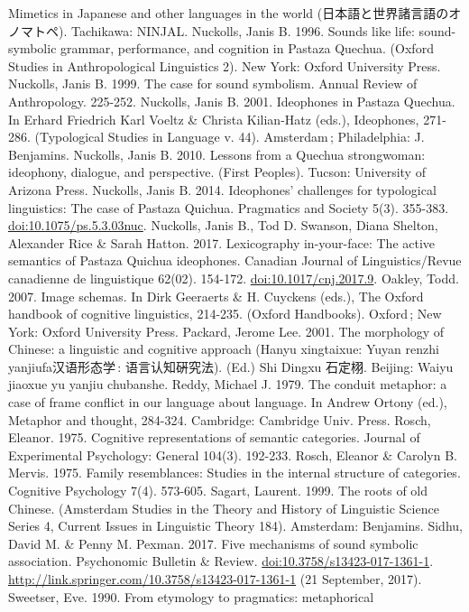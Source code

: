 \documentclass[12pt,article,oneside]{memoir}
\theoremstyle{definition}
\theoremstyle{definition}
\theoremstyle{definition}
\theoremstyle{remark}
\begin{document}
Mimetics in Japanese and other languages in the world
(日本語と世界諸言語のオノマトペ). Tachikawa: NINJAL. Nuckolls, Janis B.
1996. Sounds like life: sound-symbolic grammar, performance, and
cognition in Pastaza Quechua. (Oxford Studies in Anthropological
Linguistics 2). New York: Oxford University Press. Nuckolls, Janis B.
1999. The case for sound symbolism. Annual Review of Anthropology.
225-252. Nuckolls, Janis B. 2001. Ideophones in Pastaza Quechua. In
Erhard Friedrich Karl Voeltz \& Christa Kilian-Hatz (eds.), Ideophones,
271-286. (Typological Studies in Language v. 44). Amsterdam\,;
Philadelphia: J. Benjamins. Nuckolls, Janis B. 2010. Lessons from a
Quechua strongwoman: ideophony, dialogue, and perspective. (First
Peoples). Tucson: University of Arizona Press. Nuckolls, Janis B. 2014.
Ideophones' challenges for typological linguistics: The case of Pastaza
Quichua. Pragmatics and Society 5(3). 355-383.
\url{doi:10.1075/ps.5.3.03nuc}. Nuckolls, Janis B., Tod D. Swanson,
Diana Shelton, Alexander Rice \& Sarah Hatton. 2017. Lexicography
in-your-face: The active semantics of Pastaza Quichua ideophones.
Canadian Journal of Linguistics/Revue canadienne de linguistique 62(02).
154-172. \url{doi:10.1017/cnj.2017.9}. Oakley, Todd. 2007. Image
schemas. In Dirk Geeraerts \& H. Cuyckens (eds.), The Oxford handbook of
cognitive linguistics, 214-235. (Oxford Handbooks). Oxford\,; New York:
Oxford University Press. Packard, Jerome Lee. 2001. The morphology of
Chinese: a linguistic and cognitive approach (Hanyu xingtaixue: Yuyan
renzhi yanjiufa汉语形态学\,: 语言认知硏究法). (Ed.) Shi Dingxu 石定栩.
Beijing: Waiyu jiaoxue yu yanjiu chubanshe. Reddy, Michael J. 1979. The
conduit metaphor: a case of frame conflict in our language about
language. In Andrew Ortony (ed.), Metaphor and thought, 284-324.
Cambridge: Cambridge Univ. Press. Rosch, Eleanor. 1975. Cognitive
representations of semantic categories. Journal of Experimental
Psychology: General 104(3). 192-233. Rosch, Eleanor \& Carolyn B.
Mervis. 1975. Family resemblances: Studies in the internal structure of
categories. Cognitive Psychology 7(4). 573-605. Sagart, Laurent. 1999.
The roots of old Chinese. (Amsterdam Studies in the Theory and History
of Linguistic Science Series 4, Current Issues in Linguistic Theory
184). Amsterdam: Benjamins. Sidhu, David M. \& Penny M. Pexman. 2017.
Five mechanisms of sound symbolic association. Psychonomic Bulletin \&
Review. \url{doi:10.3758/s13423-017-1361-1}.
\url{http://link.springer.com/10.3758/s13423-017-1361-1} (21 September,
2017). Sweetser, Eve. 1990. From etymology to pragmatics: metaphorical
\end{document}
